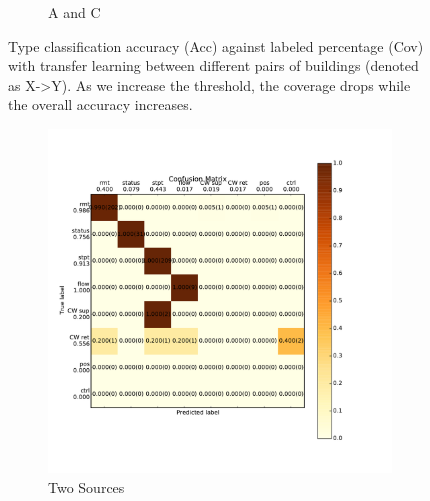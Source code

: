 \begin{figure}[ht!]
\begin{subfigure}{0.32\textwidth}
                \caption{A and C}
  \end{subfigure}
\caption{Type classification accuracy (Acc) against labeled percentage (Cov) with transfer learning between different pairs of buildings (denoted as X->Y). As we increase the threshold, the coverage drops while the overall accuracy increases. }
\label{fig:tl_acc}
\end{figure}

\begin{figure}[ht!]
\centering
  \begin{subfigure}{0.48\textwidth}
                \centering
    \includegraphics[width=\textwidth]{./fig/cm_multi}
                \caption{Two Sources}
  \end{subfigure}
  \begin{subfigure}{0.48\textwidth}
                \centering

\end{subfigure}
\end{figure}
